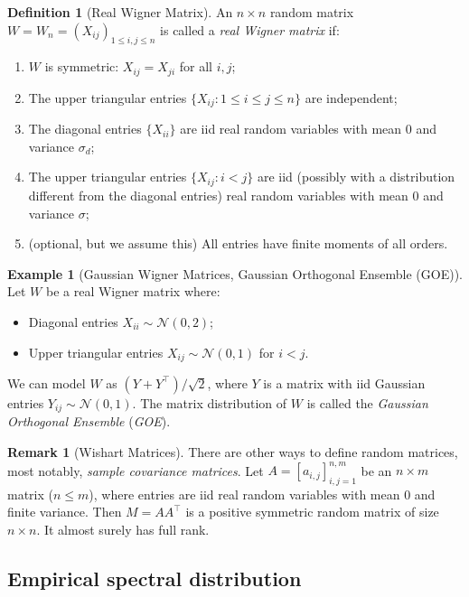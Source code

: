 \documentclass[letterpaper,11pt,oneside,reqno]{book}
\numberwithin{equation}{chapter}  %
\theoremstyle{definition}
\newtheorem{definition}[proposition]{Definition}
\newtheorem{remark}[proposition]{Remark}
\newtheorem{example}[proposition]{Example}
\begin{document}
\begin{definition}[Real Wigner Matrix]
An $n \times n$ random matrix $W=W_n = (X_{ij})_{1 \leq i,j \leq n}$ is called a \emph{real Wigner matrix} if:
\begin{enumerate}
    \item $W$ is symmetric: $X_{ij} = X_{ji}$ for all $i,j$;
    \item The upper triangular entries $\{X_{ij}: 1 \leq i \leq j \leq n\}$ are independent;
    \item The diagonal entries $\{X_{ii}\}$ are iid real random variables with mean $0$ and variance $\sigma_d$;
    \item The upper triangular entries $\{X_{ij}: i < j\}$ are iid
			(possibly with a distribution different from the diagonal entries) real random variables
			with mean $0$ and variance $\sigma$;
		\item (optional, but we assume this) All entries have finite moments of all orders.
\end{enumerate}
\end{definition}

\begin{example}[Gaussian Wigner Matrices, Gaussian Orthogonal Ensemble (GOE)]
Let $W$ be a real Wigner matrix where:
\begin{itemize}
    \item Diagonal entries $X_{ii} \sim \mathcal{N}(0, 2)$;
		\item Upper triangular entries $X_{ij} \sim \mathcal{N}(0, 1)$ for $i < j$.
\end{itemize}
We can model $W$ as $(Y+Y^\top)/\sqrt{2}$,
where $Y$ is a matrix with iid Gaussian entries $Y_{ij} \sim \mathcal{N}(0, 1)$.
The matrix distribution of $W$ is called
the \emph{Gaussian Orthogonal Ensemble} (\emph{GOE}).
\end{example}

\begin{remark}[Wishart Matrices]
	\label{lecture1:rmk:wishart-matrices}
	There are other ways to define random matrices,
	most notably, \emph{sample covariance matrices}.
	Let $A = [a_{i,j}]_{i,j=1}^{n,m}$ be an $n \times m$ matrix ($n \leq m$), where entries are iid real random variables with
	mean $0$ and finite variance.
	Then $M = AA^\top$ is a positive symmetric random matrix of
	size $n \times n$. It almost surely has full rank.
\end{remark}


\subsection{Empirical spectral distribution}
\end{document}
